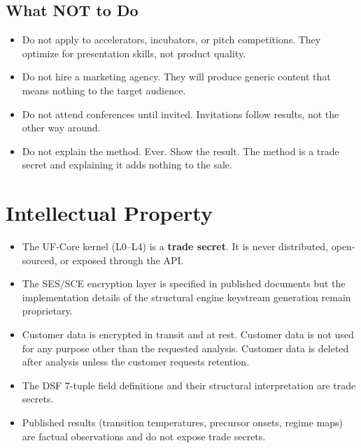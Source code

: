 \documentclass[11pt,letterpaper]{article}
\begin{document}
\subsection{What NOT to Do}

\begin{itemize}
  \item Do not apply to accelerators, incubators, or pitch competitions.
    They optimize for presentation skills, not product quality.
  \item Do not hire a marketing agency. They will produce generic
    content that means nothing to the target audience.
  \item Do not attend conferences until invited. Invitations follow
    results, not the other way around.
  \item Do not explain the method. Ever. Show the result. The method
    is a trade secret and explaining it adds nothing to the sale.
\end{itemize}

\section{Intellectual Property}

\begin{itemize}
  \item The UF-Core kernel (L0--L4) is a \textbf{trade secret}.
    It is never distributed, open-sourced, or exposed through the API.
  \item The SES/SCE encryption layer is specified in published documents
    but the implementation details of the structural engine keystream
    generation remain proprietary.
  \item Customer data is encrypted in transit and at rest. Customer data
    is not used for any purpose other than the requested analysis.
    Customer data is deleted after analysis unless the customer requests
    retention.
  \item The DSF 7-tuple field definitions and their structural
    interpretation are trade secrets.
  \item Published results (transition temperatures, precursor onsets,
    regime maps) are factual observations and do not expose trade secrets.
\end{itemize}

\end{document}

